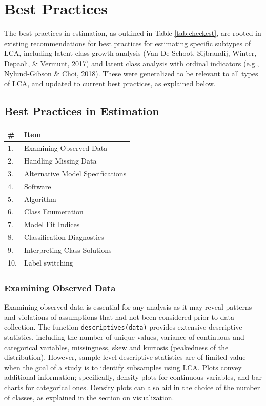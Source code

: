 \documentclass[
  ,man,floatsintext]{apa6}
\begin{document}
\hypertarget{best-practices}{%
\section{Best Practices}\label{best-practices}}

The best practices in estimation, as outlined in Table
\ref{tab:checkest}, are rooted in existing recommendations for best
practices for estimating specific subtypes of LCA, including latent
class growth analysis (Van De Schoot, Sijbrandij, Winter, Depaoli, \& Vermunt, 2017) and latent
class analysis with ordinal indicators (e.g., Nylund-Gibson \& Choi, 2018).
These were generalized to be relevant to all types of LCA, and updated
to current best practices, as explained below.

\hypertarget{best-practices-in-estimation}{%
\subsection{Best Practices in Estimation}\label{best-practices-in-estimation}}

\begin{tabular}[t]{l|l}
\hline
\# & Item\\
\hline
1. & Examining Observed Data\\
\hline
2. & Handling Missing Data\\
\hline
3. & Alternative Model Specifications\\
\hline
4. & Software\\
\hline
5. & Algorithm\\
\hline
6. & Class Enumeration\\
\hline
7. & Model Fit Indices\\
\hline
8. & Classification Diagnostics\\
\hline
9. & Interpreting Class Solutions\\
\hline
10. & Label switching\\
\hline
\end{tabular}

\hypertarget{examining-observed-data}{%
\subsubsection{Examining Observed Data}\label{examining-observed-data}}

Examining observed data is essential for any analysis as it may reveal
patterns and violations of assumptions that had not been considered
prior to data collection. The function \texttt{descriptives(data)} provides
extensive descriptive statistics, including the number of unique values,
variance of continuous and categorical variables, missingness, skew and
kurtosis (peakedness of the distribution). However, sample-level
descriptive statistics are of limited value when the goal of a study is
to identify subsamples using LCA. Plots convey additional information;
specifically, density plots for continuous variables, and bar charts for
categorical ones. Density plots can also aid in the choice of the number
of classes, as explained in the section on visualization.
\end{document}
